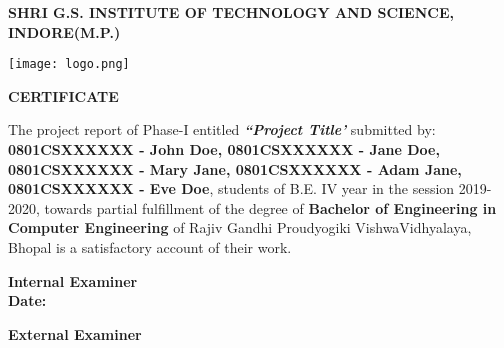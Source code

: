 \pagestyle{plain}
\large
\begin{center}
    


\textbf{SHRI G.S. INSTITUTE OF TECHNOLOGY AND SCIENCE, INDORE(M.P.)\\}

\vspace*{0.7cm}

\texttt{[image: logo.png]}

\vspace*{0.7cm}
\normalfont\LARGE\centering
\textbf{CERTIFICATE} \\
\end{center}
\normalsize
The project report of Phase-I entitled \emph{\textbf{``Project Title'}} submitted by:
\textbf{
0801CSXXXXXX - John Doe,
0801CSXXXXXX - Jane Doe, 
0801CSXXXXXX - Mary Jane, 
0801CSXXXXXX - Adam Jane, 
0801CSXXXXXX - Eve Doe},
students of B.E. IV year in the session 2019-2020, towards partial fulfillment of the degree of \textbf{Bachelor of Engineering in Computer Engineering} of Rajiv Gandhi Proudyogiki VishwaVidhyalaya, Bhopal is a satisfactory account of their work.



\begin{minipage}[t]{0.45\textwidth}
    \flushleft
    \vspace*{3cm}
    \large
    \textbf{Internal Examiner\\}
    \vspace*{1.5cm}
    \textbf{Date:}
\end{minipage}
\hfill
\begin{minipage}[t]{0.45\textwidth}
    \flushleft
    \vspace*{3cm}
    \large
    \textbf{External Examiner}
  
\end{minipage}